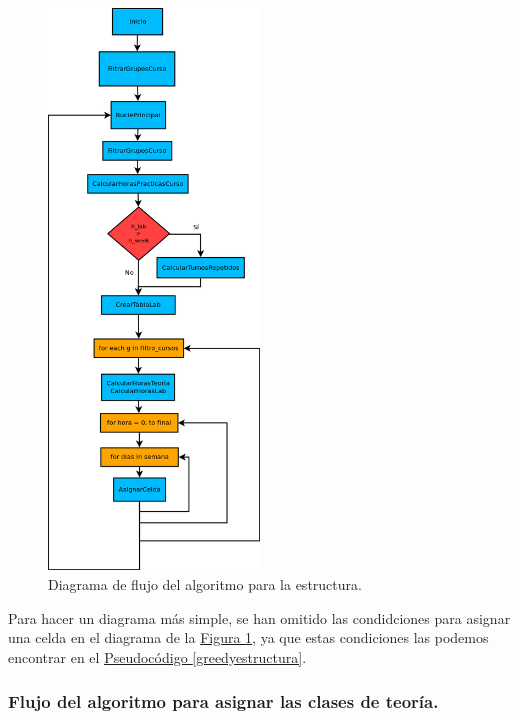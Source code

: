 \begin{figure}[H]
\centering
\includegraphics[width=0.5\textwidth]{img/d1}
\caption{Diagrama de flujo del algoritmo para la estructura.}
\label{d1}
\end{figure}

Para hacer un diagrama más simple, se han omitido las condidciones para asignar una celda en el diagrama de la \hyperref[d1]{Figura \ref*{d1}}, ya que estas condiciones las podemos encontrar en el \hyperref[greedyestructura]{Pseudocódigo \ref*{greedyestructura}}.

\subsubsection{Flujo del algoritmo para asignar las clases de teoría.}

